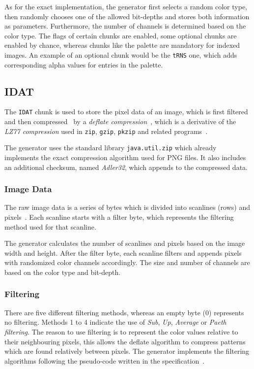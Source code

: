 \documentclass[runningheads]{llncs}
\begin{document}
As for the exact implementation, the generator first selects a random color type, then randomly chooses one of the allowed bit-depths and stores both information as parameters.
Furthermore, the number of channels is determined based on the color type. The flags of certain chunks are enabled, some optional chunks are enabled by chance, whereas chunks like the palette are mandatory for indexed images.
An example of an optional chunk would be the \texttt{tRNS} one, which adds corresponding alpha values for entries in the palette.

\subsection{IDAT}
The \texttt{IDAT} chunk is used to store the pixel data of an image, which is first filtered and then compressed~\cite{libpng_chunks} by a \textit{deflate compression}~\cite{rfc_deflate_compression}, which is a derivative of the \textit{LZ77 compression} used in \texttt{zip}, \texttt{gzip}, \texttt{pkzip} and related programs~\cite{libpng_deflate}.

The generator uses the standard library \texttt{java.util.zip} which already implements the exact compression algorithm used for PNG files. It also includes an additional checksum, named \textit{Adler32}, which appends to the compressed data.
\subsubsection{Image Data}
The raw image data is a series of bytes which is divided into scanlines (rows) and pixels~\cite{libpng_data_representation}. 
Each scanline starts with a filter byte, which represents the filtering method used for that scanline.

The generator calculates the number of scanlines and pixels based on the image width and height.
After the filter byte, each scanline filters and appends pixels with randomized color channels accordingly.
The size and number of channels are based on the color type and bit-depth.
\subsubsection{Filtering}
There are five different filtering methods, whereas an empty byte (0) represents no filtering. 
Methods 1 to 4 indicate the use of \textit{Sub}, \textit{Up}, \textit{Average} or \textit{Paeth filtering}.
The reason to use filtering is to represent the color values relative to their neighbouring pixels, this allows the deflate algorithm to compress patterns which are found relatively between pixels.
The generator implements the filtering algorithms following the pseudo-code written in the specification~\cite{libpng_filtering}.
\end{document}
